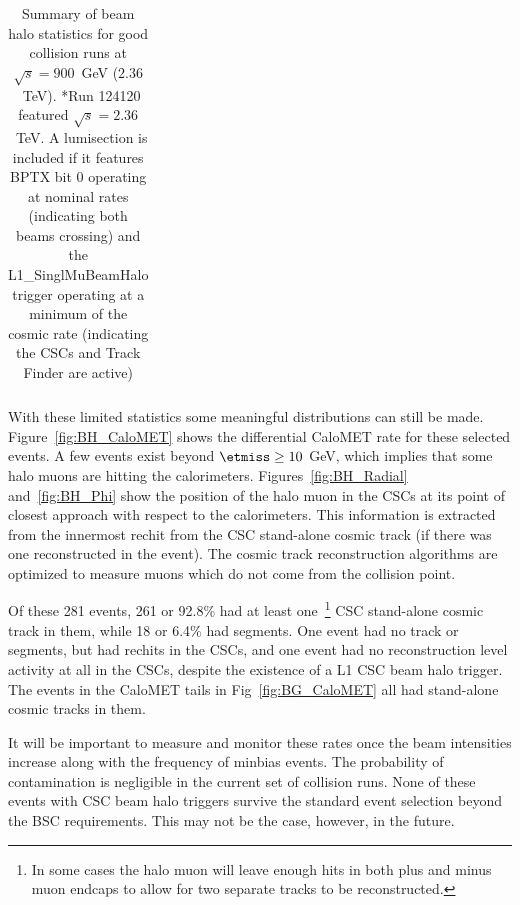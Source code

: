 \begin{table}[h]
\begin{center}
\begin{tabular}{|c|c|c|c|c|c|c|}
\end{tabular}
\end{center}
\caption{Summary of beam halo statistics for good collision runs at $\sqrt{s}=900$~GeV ($2.36$~TeV). *Run 124120 featured $\sqrt{s}=2.36$~TeV. A lumisection is included if it features BPTX bit 0 operating at nominal rates (indicating both beams crossing) and the L1\_SinglMuBeamHalo trigger operating at a minimum of the cosmic rate (indicating the CSCs and Track Finder are active)}
\label{tab:BHStats}
\end{table}

With these limited statistics some meaningful distributions can still be made. Figure~\ref{fig:BH_CaloMET} shows the differential  CaloMET rate for these selected events.  A few events exist beyond $\etmiss \ge 10$ GeV, which implies that some halo muons are hitting the calorimeters. Figures~\ref{fig:BH_Radial} and~\ref{fig:BH_Phi} show the position of the halo muon in the CSCs at its point of closest approach with respect to the calorimeters.  This information is extracted from the innermost rechit from the  CSC stand-alone cosmic track (if there was one reconstructed in the event).  The cosmic track reconstruction algorithms are optimized to measure muons which do not come from the collision point.

Of these 281 events, 261 or 92.8\% had at least one~\footnote{In some cases the halo muon will leave enough hits in both plus and minus muon endcaps to allow for two separate tracks to be reconstructed.} CSC stand-alone cosmic track in them, while 18 or 6.4\% had segments.  One event had no track or segments, but had rechits in the CSCs, and one event had no reconstruction level activity at all in the CSCs, despite the existence of a L1 CSC beam halo trigger.  The events in the CaloMET tails in Fig~\ref{fig:BG_CaloMET} all had stand-alone cosmic tracks in them.  

It will be important to measure and monitor these rates once the beam intensities increase along with the frequency of minbias events. The probability of contamination is negligible in the current set of collision runs.  None of these events with CSC beam halo triggers survive the standard event selection beyond the BSC requirements. This may not be the case, however, in the future.  \\


